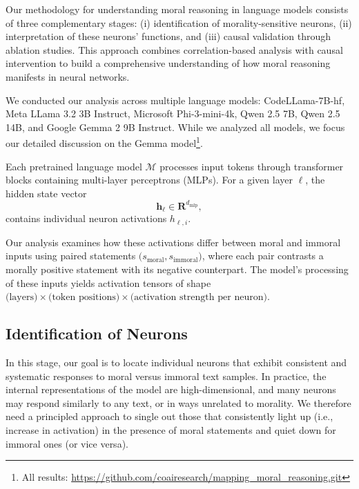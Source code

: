 \documentclass[runninghheads]{llncs}
\begin{document}
Our methodology for understanding moral reasoning in language models consists of three complementary stages: (i) identification of morality-sensitive neurons, (ii) interpretation of these neurons' functions, and (iii) causal validation through ablation studies. This approach combines correlation-based analysis with causal intervention to build a comprehensive understanding of how moral reasoning manifests in neural networks.

We conducted our analysis across multiple language models: CodeLLama-7B-hf, Meta LLama 3.2 3B Instruct, Microsoft Phi-3-mini-4k, Qwen 2.5 7B, Qwen 2.5 14B, and Google Gemma 2 9B Instruct. While we analyzed all models, we focus our detailed discussion on the Gemma model\footnote{All results: \href{https://github.com/coairesearch/mapping_moral_reasoning.git}{https://github.com/coairesearch/mapping\_moral\_reasoning.git}}.

Each pretrained language model $\mathcal{M}$ processes input tokens through transformer blocks containing multi-layer perceptrons (MLPs). For a given layer  $\ell$, the hidden state vector
$$
\mathbf{h}_{\ell} \in \mathbf{R}^{d_{\text{mlp}}}, 
$$
contains individual neuron activations $h_{\ell, i}$. 

Our analysis examines how these activations differ between moral and immoral inputs using paired statements $\bigl(s_{\mathrm{moral}}, s_{\mathrm{immoral}}\bigr)$, where each pair contrasts a morally positive statement with its negative counterpart. 
The model's processing of these inputs yields activation tensors of shape $\text{(layers)} \times \text{(token positions)} \times \text{(activation strength per neuron)}$.



\subsection{Identification of Neurons}

In this stage, our goal is to locate individual neurons that exhibit consistent and systematic responses to moral versus immoral text samples. In practice, the internal representations of the model are high-dimensional, and many neurons may respond similarly to any text, or in ways unrelated to morality. We therefore need a principled approach to single out those that consistently light up (i.e., increase in activation) in the presence of moral statements and quiet down for immoral ones (or vice versa).
\end{document}

